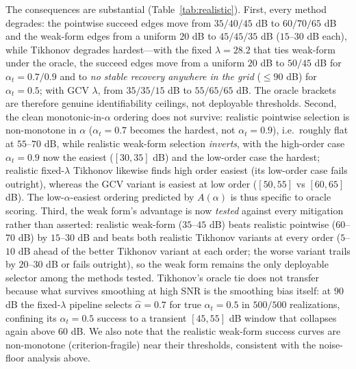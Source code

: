 \documentclass[review,3p,times]{elsarticle}
\begin{document}
The consequences are substantial (Table~\ref{tab:realistic}). First, every method degrades: the pointwise succeed edges move from $35/40/45$ dB to $60/70/65$ dB and the weak-form edges from a uniform $20$ dB to $45/45/35$ dB ($15$--$30$ dB each), while Tikhonov degrades hardest---with the fixed $\lambda=28.2$ that ties weak-form under the oracle, the succeed edges move from a uniform $20$ dB to $50/45$ dB for $\alpha_t=0.7/0.9$ and to \emph{no stable recovery anywhere in the grid} ($\le 90$ dB) for $\alpha_t=0.5$; with GCV $\lambda$, from $35/35/15$ dB to $55/65/65$ dB. The oracle brackets are therefore genuine identifiability ceilings, not deployable thresholds. Second, the clean monotonic-in-$\alpha$ ordering does not survive: realistic pointwise selection is non-monotone in $\alpha$ ($\alpha_t=0.7$ becomes the hardest, not $\alpha_t=0.9$), i.e.\ roughly flat at $55$--$70$ dB, while realistic weak-form selection \emph{inverts}, with the high-order case $\alpha_t=0.9$ now the easiest ($[30,35]$ dB) and the low-order case the hardest; realistic fixed-$\lambda$ Tikhonov likewise finds high order easiest (its low-order case fails outright), whereas the GCV variant is easiest at low order ($[50,55]$ vs $[60,65]$ dB). The low-$\alpha$-easiest ordering predicted by $A(\alpha)$ is thus specific to oracle scoring. Third, the weak form's advantage is now \emph{tested} against every mitigation rather than asserted: realistic weak-form ($35$--$45$ dB) beats realistic pointwise ($60$--$70$ dB) by $15$--$30$ dB and beats both realistic Tikhonov variants at every order ($5$--$10$ dB ahead of the better Tikhonov variant at each order; the worse variant trails by $20$--$30$ dB or fails outright), so the weak form remains the only deployable selector among the methods tested. Tikhonov's oracle tie does not transfer because what survives smoothing at high SNR is the smoothing bias itself: at $90$ dB the fixed-$\lambda$ pipeline selects $\hat\alpha=0.7$ for true $\alpha_t=0.5$ in $500/500$ realizations, confining its $\alpha_t=0.5$ success to a transient $[45,55]$ dB window that collapses again above $60$ dB. We also note that the realistic weak-form success curves are non-monotone (criterion-fragile) near their thresholds, consistent with the noise-floor analysis above.
\end{document}
